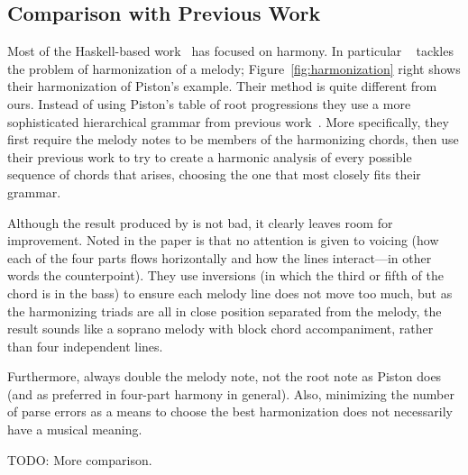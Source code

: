 \HarmonizationMT

\subsection{Comparison with Previous Work}
\label{sec:harmony:compare}

Most of the Haskell-based
work~\citep{magalhaes-harmtrace,koops-fharm,magalhaes-fcomp} has
focused on harmony. In particular \fharm~\citep{koops-fharm} tackles
the problem of harmonization of a melody;
Figure~\ref{fig:harmonization} right shows their harmonization of
Piston's example. Their method is quite different from
ours. Instead of using Piston's table of root progressions they use a
more sophisticated hierarchical grammar from previous
work~\citep{magalhaes-harmtrace}.
More specifically, they first require the melody notes to be members of
the harmonizing chords, then use their previous work to try to create
a harmonic analysis of every possible sequence of chords that arises,
choosing the one that most closely fits their grammar.

Although the result produced by \fharm is not bad, it clearly leaves
room for improvement. Noted in
the paper is that no attention is given to voicing (how each of the
four parts flows horizontally and how the lines interact---in other
words the counterpoint). They use inversions (in which the
third or fifth of the chord is in the bass) to ensure each melody line
does not move too much, but as the harmonizing triads are all in close
position separated from the melody, the result sounds like a soprano
melody with block chord accompaniment, rather than four independent
lines.

Furthermore, \fharm always double the melody note, not the root note
as Piston does (and as preferred in four-part harmony in general).
Also, minimizing the number of parse errors as a means
to choose the best harmonization does not necessarily have a musical
meaning.

TODO: More comparison.
